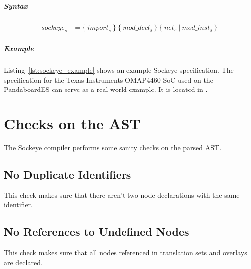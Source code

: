 \documentclass[a4paper,11pt,twoside]{report}
\begin{document}
{{{\paragraph{Syntax}
\begin{align*}
    \textit{sockeye}_s & \mathop{=}
        \big\{\ 
            \textit{import}_s\ 
        \big\}\ 
        \big\{\ 
            \textit{mod\_decl}_s\ 
        \big\}\ 
        \big\{\ 
            \textit{net}_s\ |\ \textit{mod\_inst}_s\ 
        \big\}
\end{align*}

\paragraph{Example}
Listing~\ref{lst:sockeye_example} shows an example Sockeye specification.
The specification for the Texas Instruments OMAP4460 SoC used on the PandaboardES can serve as a real world example. It is located in .

\clearpage



\chapter{Checks on the AST}
\label{chap:checks}
The Sockeye compiler performs some sanity checks on the parsed AST.

\section{No Duplicate Identifiers}
This check makes sure that there aren't two node declarations with the same identifier.

\section{No References to Undefined Nodes}
This check makes sure that all nodes referenced in translation sets and overlays are declared.


}}}
\end{document}

